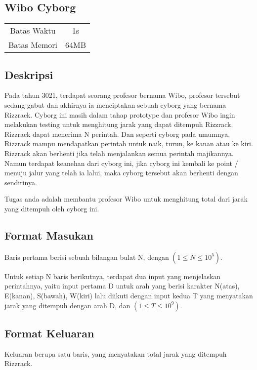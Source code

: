 \documentclass{article}
\begin{document}
\begin{center}
    \section*{Wibo Cyborg} %

    \begin{tabular}{ | c c | }
        \hline
        Batas Waktu  & 1s \\    %
        Batas Memori & 64MB \\  %
        \hline
    \end{tabular}
\end{center}

\subsection*{Deskripsi}
Pada tahun 3021, terdapat seorang profesor bernama Wibo, profesor tersebut sedang gabut dan akhirnya ia menciptakan sebuah cyborg yang bernama Rizzrack. Cyborg ini masih dalam tahap prototype dan profesor Wibo ingin melakukan testing untuk menghitung jarak yang dapat ditempuh Rizzrack. Rizzrack dapat menerima N perintah. Dan seperti cyborg pada umumnya, Rizzrack mampu mendapatkan perintah untuk naik, turun, ke kanan atau ke kiri. Rizzrack akan berhenti jika telah menjalankan semua perintah majikannya. Namun terdapat keanehan dari cyborg ini, jika cyborg ini kembali ke point / menuju jalur yang telah ia lalui, maka cyborg tersebut akan berhenti dengan sendirinya.

Tugas anda adalah membantu profesor Wibo untuk menghitung total dari jarak yang ditempuh oleh cyborg ini.

\subsection*{Format Masukan}

Baris pertama berisi sebuah bilangan bulat N, dengan $(1 \leq N  \leq 10^5)$. 

Untuk setiap N baris berikutnya, terdapat dua input yang menjelaskan perintahnya, yaitu input pertama D untuk arah yang berisi karakter N(atas), E(kanan), S(bawah), W(kiri) lalu diikuti dengan input kedua T yang menyatakan jarak yang ditempuh dengan arah D, dan $(1 \leq T  \leq 10^9)$.


\subsection*{Format Keluaran}
Keluaran berupa satu baris, yang menyatakan total jarak yang ditempuh Rizzrack.
\end{document}
